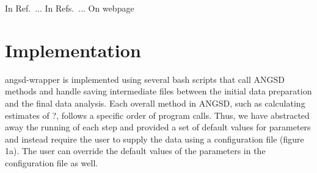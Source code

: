 \documentclass[final]{beamer}
\begin{document}
\begin{frame}[t]
\begin{multicols}{3}
%
%

In Ref.~\cite{ref1}...
In Refs.~\cite{ref1,ref2}...
On webpage~\cite{https://github.com/arundurvasula/angsd-wrapper}


\section{Implementation}

angsd-wrapper is implemented using several bash scripts that call ANGSD methods and handle saving intermediate files between the initial data preparation and the final data analysis. Each overall method in ANGSD, such as calculating estimates of ?, follows a specific order of program calls. Thus, we have abstracted away the running of each step and provided a set of default values for parameters and instead require the user to supply the data using a configuration file (figure 1a). The user can override the default values of the parameters in the configuration file as well.


\end{multicols}
\end{frame}
\end{document}
